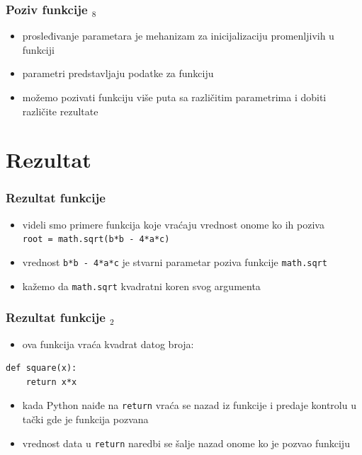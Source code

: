\documentclass[utf8,compress]{beamer}
\begin{document}
\begin{frame}[fragile]
  \frametitle{Poziv funkcije $_8$}
  \begin{itemize}
    \item prosleđivanje parametara je mehanizam za inicijalizaciju promenljivih u funkciji
    \item parametri predstavljaju  podatke za funkciju
    \item možemo pozivati funkciju više puta sa različitim parametrima i dobiti različite rezultate
  \end{itemize}
\end{frame}

\section{Rezultat}

\begin{frame}[fragile]
  \frametitle{Rezultat funkcije}
  \begin{itemize}
    \item videli smo primere funkcija koje vraćaju vrednost onome ko ih poziva \\
      \texttt{root = math.sqrt(b*b - 4*a*c)}
    \item vrednost \texttt{b*b - 4*a*c} je stvarni parametar poziva funkcije \texttt{math.sqrt}
    \item kažemo da \texttt{math.sqrt}  kvadratni koren svog argumenta
  \end{itemize}
\end{frame}

\begin{frame}[fragile]
  \frametitle{Rezultat funkcije $_2$}
  \begin{itemize}
    \item ova funkcija vraća kvadrat datog broja: \\
  \end{itemize}
\begin{verbatim}
def square(x):
    return x*x
\end{verbatim}
  \begin{itemize}
    \item kada Python naiđe na \texttt{return} vraća se nazad iz funkcije i predaje kontrolu u tački gde je funkcija pozvana
    \item vrednost data u \texttt{return} naredbi se šalje nazad onome ko je pozvao funkciju
  \end{itemize}
\end{frame}
\end{document}

